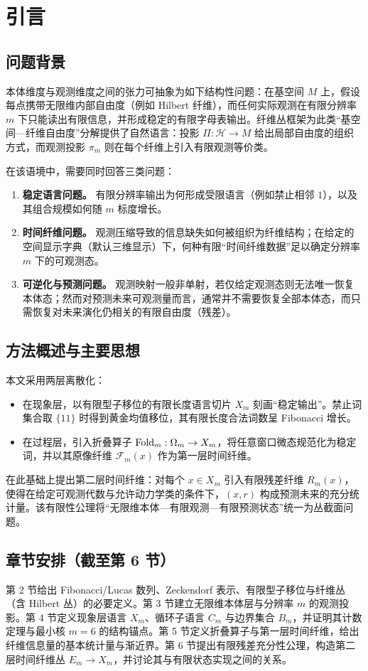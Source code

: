 \section{引言}

\subsection{问题背景}

本体维度与观测维度之间的张力可抽象为如下结构性问题：在基空间 $M$ 上，假设每点携带无限维内部自由度（例如 Hilbert 纤维），而任何实际观测在有限分辨率 $m$ 下只能读出有限信息，并形成稳定的有限字母表输出。纤维丛框架为此类“基空间—纤维自由度”分解提供了自然语言：投影 $\Pi:\mathcal H\to M$ 给出局部自由度的组织方式，而观测投影 $\pi_m$ 则在每个纤维上引入有限观测等价类。\cite{cohen_fiber_bundles}

在该语境中，需要同时回答三类问题：

\begin{enumerate}
  \item \textbf{稳定语言问题。} 有限分辨率输出为何形成受限语言（例如禁止相邻 $1$），以及其组合规模如何随 $m$ 标度增长。
  \item \textbf{时间纤维问题。} 观测压缩导致的信息缺失如何被组织为纤维结构；在给定的空间显示字典（默认三维显示）下，何种有限“时间纤维数据”足以确定分辨率 $m$ 下的可观测态。
  \item \textbf{可逆化与预测问题。} 观测映射一般非单射，若仅给定观测态则无法唯一恢复本体态；然而对预测未来可观测量而言，通常并不需要恢复全部本体态，而只需恢复对未来演化仍相关的有限自由度（残差）。
\end{enumerate}

\subsection{方法概述与主要思想}

本文采用两层离散化：

\begin{itemize}
  \item 在现象层，以有限型子移位的有限长度语言切片 $X_m$ 刻画“稳定输出”。禁止词集合取 $\{11\}$ 时得到黄金均值移位，其有限长度合法词数呈 Fibonacci 增长。\cite{scholarpedia_symbolic_dynamics}
  \item 在过程层，引入折叠算子 $\mathrm{Fold}_m:\Omega_m\to X_m$，将任意窗口微态规范化为稳定词，并以其原像纤维 $\mathcal F_m(x)$ 作为第一层时间纤维。
\end{itemize}

在此基础上提出第二层时间纤维：对每个 $x\in X_m$ 引入有限残差纤维 $R_m(x)$，使得在给定可观测代数与允许动力学类的条件下，$(x,r)$ 构成预测未来的充分统计量。该有限性公理将“无限维本体—有限观测—有限预测状态”统一为丛截面问题。

\subsection{章节安排（截至第 6 节）}

第 2 节给出 Fibonacci/Lucas 数列、Zeckendorf 表示、有限型子移位与纤维丛（含 Hilbert 丛）的必要定义。第 3 节建立无限维本体层与分辨率 $m$ 的观测投影。第 4 节定义现象层语言 $X_m$、循环子语言 $C_m$ 与边界集合 $B_m$，并证明其计数定理与最小核 $m=6$ 的结构锚点。第 5 节定义折叠算子与第一层时间纤维，给出纤维信息量的基本统计量与渐近界。第 6 节提出有限残差充分性公理，构造第二层时间纤维丛 $E_m\to X_m$，并讨论其与有限状态实现之间的关系。
